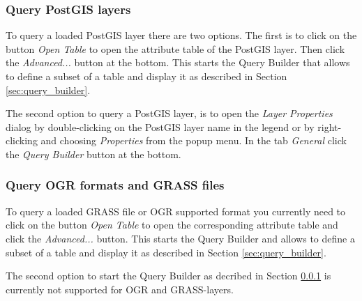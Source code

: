 \subsubsection{Query PostGIS layers}\label{sec:query_builder_postgis}

To query a loaded PostGIS layer there are two options. The first is to click on the 
button \textit{Open Table} to open the attribute table of the PostGIS layer. Then 
click the \textit{Advanced...} button at the bottom. This starts the Query Builder 
that allows to define a subset of a table and display it as described in Section 
\ref{sec:query_builder}.

The second option to query a PostGIS layer, is to open the \textit{Layer Properties} 
dialog by double-clicking on the PostGIS layer name in the legend or 
by right-clicking and choosing \textit{Properties} from the popup menu. In the tab 
\textit{General} click the \textit{Query Builder} button at the bottom.

\subsubsection{Query OGR formats and GRASS files}\label{sec:query_builder_ogrgrass}

To query a loaded GRASS file or OGR supported format you currently need to click on the 
button \textit{Open Table} to open the corresponding attribute table and click the 
\textit{Advanced...} button. This starts the Query Builder and allows to define a 
subset of a table and display it as described in Section \ref{sec:query_builder}. 

The second option to start the Query Builder as decribed in Section 
\ref{sec:query_builder_postgis} is currently not supported for OGR and GRASS-layers.

